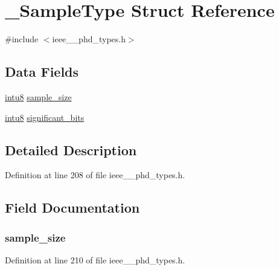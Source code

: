 \hypertarget{struct___sample_type}{}\section{\+\_\+\+Sample\+Type Struct Reference}
\label{struct___sample_type}


{\ttfamily \#include $<$ieee\+\_\+\_\+phd\+\_\+types.\+h$>$}

\subsection*{Data Fields}
\begin{DoxyCompactItemize}
\item 
\hyperlink{ieee__11073__phd__types_8h_ae21d5428a584a153613cbe335630d3f4}{intu8} \hyperlink{struct___sample_type_aa0f2d78f8cab28902530ab9d717110be}{sample\+\_\+size}
\item 
\hyperlink{ieee__11073__phd__types_8h_ae21d5428a584a153613cbe335630d3f4}{intu8} \hyperlink{struct___sample_type_a5c2d9d3038349b3667511c0756fd663d}{significant\+\_\+bits}
\end{DoxyCompactItemize}


\subsection{Detailed Description}


Definition at line 208 of file ieee\+\_\+\_\+phd\+\_\+types.\+h.



\subsection{Field Documentation}
\hypertarget{struct___sample_type_aa0f2d78f8cab28902530ab9d717110be}{}
\subsubsection[{sample\+\_\+size}]{ sample\+\_\+size}\label{struct___sample_type_aa0f2d78f8cab28902530ab9d717110be}


Definition at line 210 of file ieee\+\_\+\_\+phd\+\_\+types.\+h.

\hypertarget{struct___sample_type_a5c2d9d3038349b3667511c0756fd663d}{}
